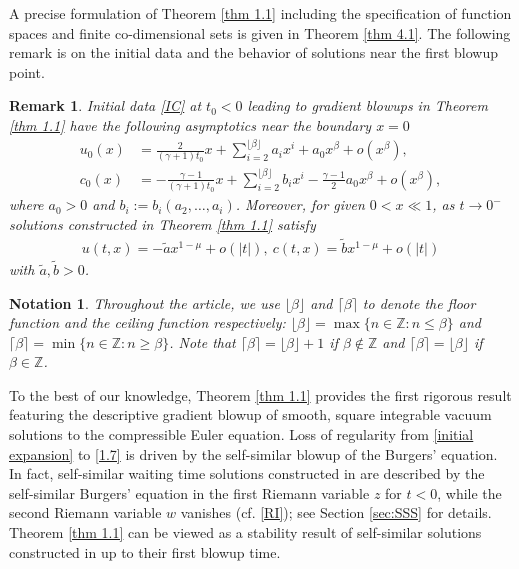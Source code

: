 \documentclass{article}
\newcommand{\ga}{\gamma}
\def\be{\begin{equation}}
\def\ee{\end{equation}}
\def\beqa{\begin{equation}\begin{aligned}}
\def\eeqa{\end{aligned}\end{equation}}
\numberwithin{equation}{section}
\newtheorem{remark}[theorem]{Remark}
\newtheorem*{notation*}{Notation}
\begin{document}
A precise formulation of Theorem \ref{thm 1.1} including the specification
of function spaces and finite co-dimensional sets is given in Theorem \ref{thm 4.1}. The following remark is on the initial data and the behavior of solutions near the first blowup point. 


\begin{remark} Initial data \eqref{IC} at $t_0<0$ 
leading to gradient blowups in Theorem \ref{thm 1.1}  
have the following asymptotics near the boundary $x=0$
    \be
    \begin{split}\label{initial expansion}
         u_0(x) &=  \frac{2}{(\ga+1)t_0} x + \sum_{i=2}^{\lfloor\beta \rfloor} a_i x^i + a_0 x^{\beta} + o(x^{\beta}),\\
        c_0(x)&=  -\frac{\ga-1}{(\ga+1)t_0} x + \sum_{i=2}^{\lfloor\beta \rfloor} b_i x^i -\frac{\ga-1}{2} a_0 x^{\beta} + o(x^{\beta}),
    \end{split}
    \ee
    where $a_0>0$ and $b_i:= b_i( a_2,\dots, a_i)$. Moreover, for given $0<x\ll 1$, as $t\to 0^-$ solutions constructed in Theorem \ref{thm 1.1} satisfy 
   \beqa\label{1.7}
        u(t,x) = -\tilde a x^{1-\mu}+o(|t|),\  c(t,x) = \tilde b x^{1-\mu}+o(|t|)
   \eeqa
with $ \tilde a, \tilde b>0$.
\end{remark}


\begin{notation*} 
Throughout the article, we use $\lfloor\beta \rfloor$  and  $\lceil\beta \rceil$ to denote the floor function  and the ceiling function respectively:  $\lfloor\beta \rfloor = \max\{ n \in \mathbb Z: n \le \beta \}$ and   $\lceil\beta \rceil = \min\{ n \in \mathbb Z: n \ge \beta \}$. Note that $\lceil\beta \rceil = \lfloor\beta \rfloor +1  $ if $\beta \notin \mathbb Z$ and  $\lceil\beta \rceil = \lfloor\beta \rfloor  $ if $\beta \in  \mathbb Z$. 
\end{notation*} 

To the best of our knowledge,  Theorem \ref{thm 1.1} provides  the first rigorous result featuring the descriptive gradient blowup of smooth, square integrable vacuum solutions to the compressible Euler equation. 
Loss of regularity from \eqref{initial expansion} to \eqref{1.7} is driven by the self-similar blowup of the Burgers' equation. In fact, self-similar waiting time solutions constructed in \cite{JLN2025}  are described by %
the self-similar Burgers' equation in the first Riemann variable $z$ for $t<0$, while the second Riemann variable $w$ vanishes (cf. \eqref{RI}); see Section \ref{sec:SSS} for details. Theorem \ref{thm 1.1} can be viewed as a stability result of self-similar solutions constructed in \cite{JLN2025} up to their first blowup time.     
\end{document}
